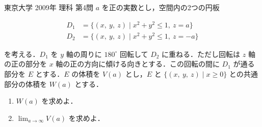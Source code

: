 \documentclass[a4paper]{ltjsarticle}
\begin{document}
\begin{itembox}[l]{東京大学 2009年 理科 第4問}
    $a$ を正の実数とし，空間内の2つの円板

    \begin{align*}
        D_1 & =\{(x,\ y,\ z)\mid x^2+y^2\leq 1,\ z=a\}  \\
        D_2 & =\{(x,\ y,\ z)\mid x^2+y^2\leq 1,\ z=-a\}
    \end{align*}

    を考える．$D_1$ を $y$ 軸の周りに $180^\circ$ 回転して $D_2$ に重ねる．ただし回転は $z$ 軸の正の部分を $x$ 軸の正の方向に傾ける向きとする．この回転の間に $D_1$ が通る部分を $E$ とする．$E$ の体積を $V(a)$ とし，$E$ と $\{(x,\ y,\ z)\mid x\geq 0\}$ との共通部分の体積を $W(a)$ とする．

    \begin{enumerate}[label=(\arabic*)]
        \item $W(a)$ を求めよ．

        \item $\displaystyle\lim_{a\to\infty}V(a)$ を求めよ．
    \end{enumerate}
\end{itembox}
\end{document}
